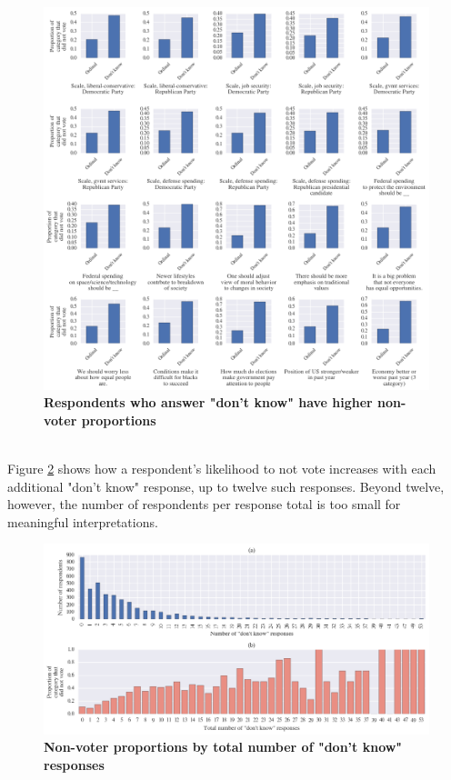 \documentclass{article}
\begin{document}
	\begin{figure}[h!]
		\begin{center}
			\includegraphics*[width=1\linewidth]{ordinal_dk}
			\caption{\textbf{Respondents who answer "don't know" have higher non-voter proportions}}
			\label{fig:ordinal_dk}
		\end{center}
	\end{figure}
	\hfill \\
	Figure \ref{fig:ordinal_dk_total} shows how a respondent's likelihood to not vote increases with each additional "don't know" response, up to twelve such responses. Beyond twelve, however, the number of respondents per response total is too small for meaningful interpretations. 
	\begin{figure}[h!]
		\begin{center}
			\includegraphics*[width=1\linewidth]{ordinal_dk_total}
			\caption{\textbf{Non-voter proportions by total number of "don't know" responses}}
			\label{fig:ordinal_dk_total}
		\end{center}
	\end{figure}
	\hfill \\
	
\end{document}
